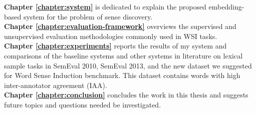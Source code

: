 \textbf{Chapter \ref{chapter:system}} is dedicated to explain the proposed embedding-based system for the problem of sense discovery. \\

\textbf{Chapter \ref{chapter:evaluation-framework}} overviews the supervised and unsupervised evaluation methodologies commonly used in WSI tasks. \\


\textbf{Chapter \ref{chapter:experiments}} reports the results of my system and comparisons of the baseline systems and other systems in literature on lexical sample tasks in SemEval 2010, SemEval 2013, and the new dataset we suggested for Word Sense Induction benchmark. This dataset contains words with high inter-annotator agreement (IAA). \\

\textbf{Chapter \ref{chapter:conclusion}} concludes the work in this thesis and suggests future topics and questions needed be investigated.
